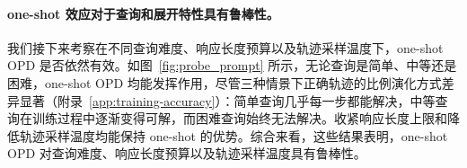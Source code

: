 \paragraph{one-shot 效应对于查询和展开特性具有鲁棒性。}

我们接下来考察在不同查询难度、响应长度预算以及轨迹采样温度下，one-shot OPD 是否依然有效。如图~\ref{fig:probe_prompt} 所示，无论查询是简单、中等还是困难，one-shot OPD 均能发挥作用，尽管三种情景下正确轨迹的比例演化方式差异显著（附录~\ref{app:training-accuracy}）：简单查询几乎每一步都能解决，中等查询在训练过程中逐渐变得可解，而困难查询始终无法解决。收紧响应长度上限和降低轨迹采样温度均能保持 one-shot 的优势。综合来看，这些结果表明，one-shot OPD 对查询难度、响应长度预算以及轨迹采样温度具有鲁棒性。
